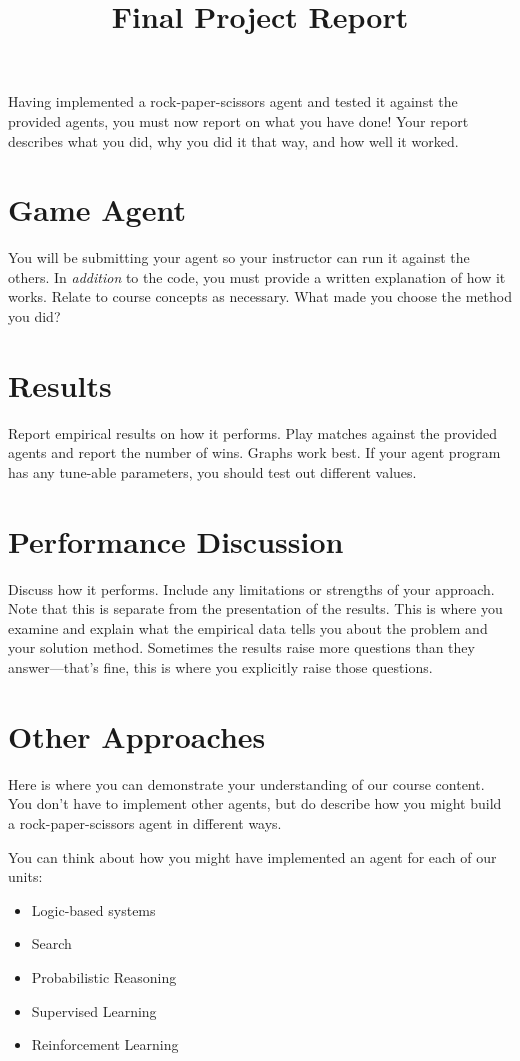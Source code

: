 \documentclass[12pt,info]{asg}
\title{Final Project Report}
\begin{document}
\maketitle

Having implemented a rock-paper-scissors agent and tested it against the provided agents, you must now report on what you have done! Your report describes what you did, why you did it that way, and how well it worked. 

\section{Game Agent}
You will be submitting your agent so your instructor can run it against the others.  In {\em addition} to the code, you must provide a written explanation of how it works. Relate to course concepts as necessary. What made you choose the method you did?

\section{Results}
Report empirical results on how it performs. Play matches against the provided agents and report the number of wins. Graphs work best. If your agent program has any tune-able parameters, you should test out different values.

\section{Performance Discussion}
Discuss how it performs. Include any limitations or strengths of your approach. Note that this is separate from the presentation of the results. This is where you examine and explain what the empirical data tells you about the problem and your solution method. Sometimes the results raise more questions than they answer---that's fine, this is where you explicitly raise those questions.

\section{Other Approaches}
Here is where you can demonstrate your understanding of our course content. You don't have to implement other agents, but do describe how you might build a rock-paper-scissors agent in different ways. 

You can think about how you might have implemented an agent for each of our units:
\begin{itemize}
\item Logic-based systems
\item Search
\item Probabilistic Reasoning
\item Supervised Learning
\item Reinforcement Learning
\end{itemize}
\end{document}
